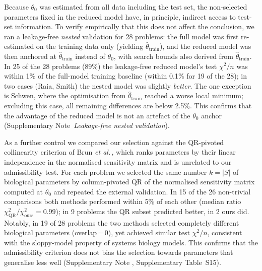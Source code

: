 \documentclass[pdflatex,sn-nature]{sn-jnl}
\theoremstyle{plain}
\begin{document}
Because $\theta_0$ was estimated from all data including the test set, the non-selected parameters fixed in the reduced model have, in principle, indirect access to test-set information. To verify empirically that this does not affect the conclusion, we ran a leakage-free \emph{nested} validation for 28 problems: the full model was first re-estimated on the training data only (yielding $\hat\theta_{\mathrm{train}}$), and the reduced model was then anchored at $\hat\theta_{\mathrm{train}}$ instead of $\theta_0$, with search bounds also derived from $\hat\theta_{\mathrm{train}}$. In 25 of the 28 problems (89\%) the leakage-free reduced model's test $\chi^2/n$ was within 1\% of the full-model training baseline (within 0.1\% for 19 of the 28); in two cases (Raia, Smith) the nested model was slightly \emph{better}. The one exception is Schwen, where the optimisation from $\hat\theta_{\mathrm{train}}$ reached a worse local minimum; excluding this case, all remaining differences are below 2.5\%. This confirms that the advantage of the reduced model is not an artefact of the $\theta_0$ anchor (Supplementary Note~\textit{Leakage-free nested validation}).

As a further control we compared our selection against the QR-pivoted collinearity criterion of Brun \emph{et al.}\,\cite{bib9}, which ranks parameters by their linear independence in the normalised sensitivity matrix and is unrelated to our admissibility test. For each problem we selected the same number $k=|S|$ of biological parameters by column-pivoted QR of the normalised sensitivity matrix computed at $\theta_0$ and repeated the external validation. In 15 of the 26 non-trivial comparisons both methods performed within 5\% of each other (median ratio $\chi^2_{\mathrm{QR}}/\chi^2_{\mathrm{ours}} = 0.99$); in 9 problems the QR subset predicted better, in 2 ours did. Notably, in 19 of 28 problems the two methods selected completely different biological parameters (overlap\,=\,0), yet achieved similar test $\chi^2/n$, consistent with the sloppy-model property of systems biology models\cite{bib15}. This confirms that the admissibility criterion does not bias the selection towards parameters that generalise less well (Supplementary Note \emph{}, Supplementary Table~S15).
\end{document}
